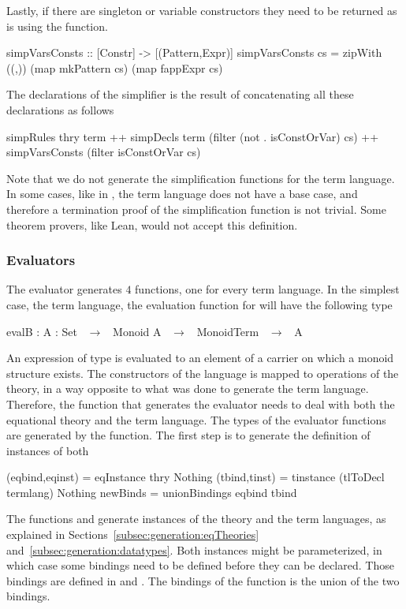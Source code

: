 Lastly, if there are singleton or variable constructors they need to be returned as is using the  function. 
\begin{hscode} 
simpVarsConsts :: [Constr] -> [(Pattern,Expr)]
simpVarsConsts cs =
  zipWith ((,)) (map mkPattern cs) (map fappExpr cs)
\end{hscode}  

The declarations of the simplifier is the result of concatenating all these declarations as follows 
\begin{hscode} 
 simpRules thry term
 ++ simpDecls term (filter (not . isConstOrVar) cs)
 ++ simpVarsConsts (filter isConstOrVar cs) 
\end{hscode} 

Note that we do not generate the simplification functions for the  term language. In some cases, like in , the  term language does not have a base case, and therefore a termination proof of the simplification function is not trivial. Some theorem provers, like Lean, would not accept this definition. 

\subsubsection{Evaluators}
\label{sec:generation:evaluator}
The evaluator generates $4$ functions, one for every term language. In the simplest case, the  term language, the evaluation function for  will have the following type 
\begin{agdacode}
 evalB : {A  : Set}  ~$\to$~ Monoid A  ~$\to$~ MonoidTerm  ~$\to$~ A
\end{agdacode}
An expression of type  is evaluated to an element of a carrier  on which a monoid structure exists. The constructors of the language is mapped to operations of the theory, in a way opposite to what was done to generate the term language. Therefore, the function that generates the evaluator needs to deal with both the equational theory and the term language. The types of the evaluator functions are generated by the  function. The first step is to generate the definition of instances of both 
\begin{hscode}
(eqbind,eqinst) = eqInstance thry Nothing
(tbind,tinst) = tinstance (tlToDecl termlang) Nothing
newBinds = unionBindings eqbind tbind
\end{hscode}
The functions  and  generate instances of the theory and the term languages, as explained in Sections~\ref{subsec:generation:eqTheories} and~\ref{subsec:generation:datatypes}. Both instances might be parameterized, in which case some bindings need to be defined before they can be declared. Those bindings are defined in  and . The bindings of the function is the union of the two bindings. 


